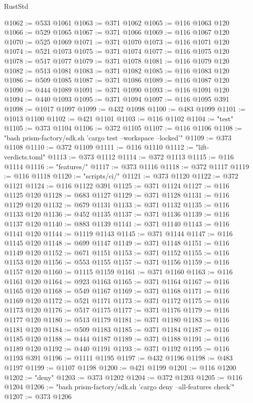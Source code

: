 \begin{lexlean}{RustStd}
\begin{coremodule}
@1062 := @533 @1061
@1063 := @371 @1062
@1065 := @116 @1063 @120
@1066 := @529 @1065
@1067 := @371 @1066
@1069 := @116 @1067 @120
@1070 := @525 @1069
@1071 := @371 @1070
@1073 := @116 @1071 @120
@1074 := @521 @1073
@1075 := @371 @1074
@1077 := @116 @1075 @120
@1078 := @517 @1077
@1079 := @371 @1078
@1081 := @116 @1079 @120
@1082 := @513 @1081
@1083 := @371 @1082
@1085 := @116 @1083 @120
@1086 := @509 @1085
@1087 := @371 @1086
@1089 := @116 @1087 @120
@1090 := @444 @1089
@1091 := @371 @1090
@1093 := @116 @1091 @120
@1094 := @440 @1093
@1095 := @371 @1094
@1097 := @116 @1095 @391
@1098 := @1017 @1097
@1099 := @432 @1098
@1100 := @483 @1099
@1101 := @1013 @1100
@1102 := @421 @1101
@1103 := @116 @1102
@1104 := "test"
@1105 := @373 @1104
@1106 := @372 @1105
@1107 := @116 @1106
@1108 := "bash prism-factory/sdk.sh 'cargo test --workspace --locked'"
@1109 := @373 @1108
@1110 := @372 @1109
@1111 := @116 @1110
@1112 := "lift-verdicts.toml"
@1113 := @373 @1112
@1114 := @372 @1113
@1115 := @116 @1114
@1116 := "features/"
@1117 := @373 @1116
@1118 := @372 @1117
@1119 := @116 @1118
@1120 := "scripts/ci/"
@1121 := @373 @1120
@1122 := @372 @1121
@1124 := @116 @1122 @391
@1125 := @371 @1124
@1127 := @116 @1125 @120
@1128 := @683 @1127
@1129 := @371 @1128
@1131 := @116 @1129 @120
@1132 := @679 @1131
@1133 := @371 @1132
@1135 := @116 @1133 @120
@1136 := @452 @1135
@1137 := @371 @1136
@1139 := @116 @1137 @120
@1140 := @883 @1139
@1141 := @371 @1140
@1143 := @116 @1141 @120
@1144 := @1119 @1143
@1145 := @371 @1144
@1147 := @116 @1145 @120
@1148 := @699 @1147
@1149 := @371 @1148
@1151 := @116 @1149 @120
@1152 := @671 @1151
@1153 := @371 @1152
@1155 := @116 @1153 @120
@1156 := @553 @1155
@1157 := @371 @1156
@1159 := @116 @1157 @120
@1160 := @1115 @1159
@1161 := @371 @1160
@1163 := @116 @1161 @120
@1164 := @923 @1163
@1165 := @371 @1164
@1167 := @116 @1165 @120
@1168 := @549 @1167
@1169 := @371 @1168
@1171 := @116 @1169 @120
@1172 := @521 @1171
@1173 := @371 @1172
@1175 := @116 @1173 @120
@1176 := @517 @1175
@1177 := @371 @1176
@1179 := @116 @1177 @120
@1180 := @513 @1179
@1181 := @371 @1180
@1183 := @116 @1181 @120
@1184 := @509 @1183
@1185 := @371 @1184
@1187 := @116 @1185 @120
@1188 := @444 @1187
@1189 := @371 @1188
@1191 := @116 @1189 @120
@1192 := @440 @1191
@1193 := @371 @1192
@1195 := @116 @1193 @391
@1196 := @1111 @1195
@1197 := @432 @1196
@1198 := @483 @1197
@1199 := @1107 @1198
@1200 := @421 @1199
@1201 := @116 @1200
@1202 := "deny"
@1203 := @373 @1202
@1204 := @372 @1203
@1205 := @116 @1204
@1206 := "bash prism-factory/sdk.sh 'cargo deny --all-features check'"
@1207 := @373 @1206

\end{coremodule}
\end{lexlean}
